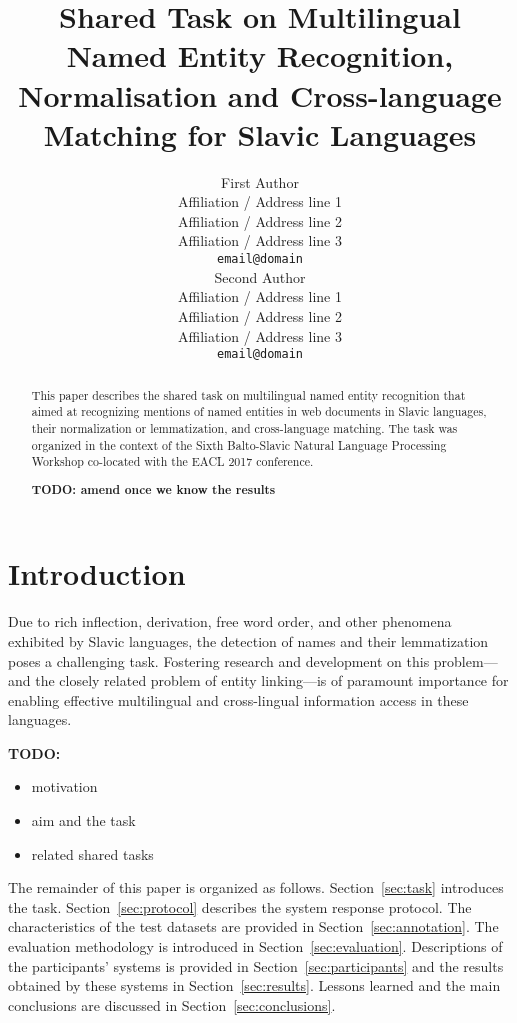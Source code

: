 \documentclass[11pt]{article}
\title{Shared Task on Multilingual Named Entity Recognition, Normalisation and Cross-language Matching for Slavic Languages}
\author{First Author \\
  Affiliation / Address line 1 \\
  Affiliation / Address line 2 \\
  Affiliation / Address line 3 \\
  {\tt email@domain} \\\And
  Second Author \\
  Affiliation / Address line 1 \\
  Affiliation / Address line 2 \\
  Affiliation / Address line 3 \\
  {\tt email@domain} \\}
\date{}
\begin{document}
\maketitle
\begin{abstract}
  This paper describes the shared task on multilingual
  named entity recognition that aimed at recognizing mentions of named
  entities in web documents in Slavic languages, their
  normalization or lemmatization, and cross-language matching. The task was
  organized in the context of the Sixth Balto-Slavic Natural Language
  Processing Workshop co-located with the EACL 2017 conference.
	
  \textbf{TODO: amend once we know the results}
\end{abstract}

\section{Introduction}
\label{sec:intro}

Due to rich inflection, derivation, free word order, and other phenomena
exhibited by Slavic languages, the detection of names and their
lemmatization poses a challenging task.  Fostering research and
development on this problem---and the closely related problem of entity
linking---is of paramount importance for enabling effective multilingual
and cross-lingual information access in these languages.

\textbf{TODO:}

\begin{itemize}

\item motivation

\item aim and the task

\item related shared tasks

\end{itemize}

The remainder of this paper is organized as follows.
%
Section~\ref{sec:task} introduces the task.  
%
Section~\ref{sec:protocol} describes the system response protocol.
%
The characteristics of the test datasets are provided in
Section~\ref{sec:annotation}.
%
The evaluation methodology is introduced in
Section~\ref{sec:evaluation}.
%
Descriptions of the participants' systems is provided in
Section~\ref{sec:participants} and the results obtained by these systems
in Section~\ref{sec:results}.
%
Lessons learned and the main conclusions are discussed in
Section~\ref{sec:conclusions}.
\end{document}
